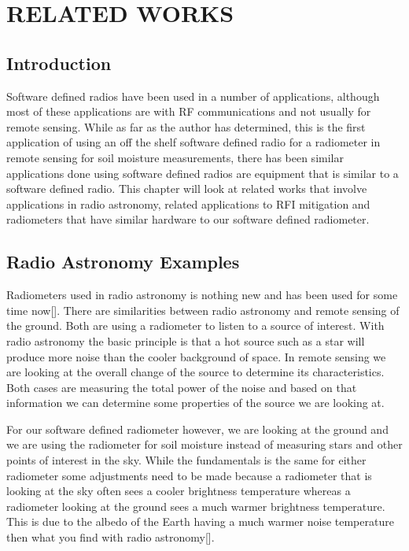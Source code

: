 

\chapter{RELATED WORKS}\label{ch:relatedworks}

\section{Introduction}
Software defined radios have been used in a number of applications, although most of these applications are with RF communications and not usually for remote sensing.  While as far as the author has determined, this is the first application of using an off the shelf software defined radio for a radiometer in remote sensing for soil moisture measurements, there has been similar applications done using software defined radios are equipment that is similar to a software defined radio.  This chapter will look at related works that involve applications in radio astronomy, related applications to RFI mitigation and radiometers that have similar hardware to our software defined radiometer.

\section{Radio Astronomy Examples}
Radiometers used in radio astronomy is nothing new and has been used for some time now[\cite{Ohm}]. There are similarities between radio astronomy and remote sensing of the ground.  Both are using a radiometer to listen to a source of interest.  With radio astronomy the basic principle is that a hot source such as a star will produce more noise than the cooler background of space.  In remote sensing we are looking at the overall change of the source to determine its characteristics.  Both cases are measuring the total power of the noise and based on that information we can determine some properties of the source we are looking at.

For our software defined radiometer however, we are looking at the ground and we are using the radiometer for soil moisture instead of measuring stars and other points of interest in the sky.  While the fundamentals is the same for either radiometer some adjustments need to be made because a radiometer that is looking at the sky often sees a cooler brightness temperature whereas a radiometer looking at the ground sees a much warmer brightness temperature.  This is due to the albedo of the Earth having a much warmer noise temperature then what you find with radio astronomy[\cite{Tiuri}].

